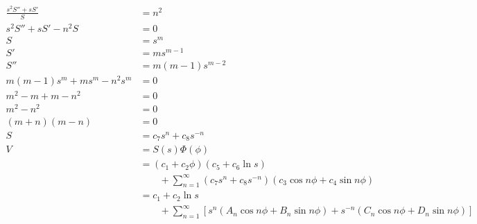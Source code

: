 \documentclass{article}
\begin{document}
\begin{align*}
  \frac{s^2 S'' + s S'}{S}        & = n^2                                                                                                               \\
  s^2 S'' + s S' - n^2 S          & = 0                                                                                                                 \\
  S                               & = s^m                                                                                                               \\
  S'                              & = m s^{m - 1}                                                                                                       \\
  S''                             & = m (m - 1) s^{m - 2}                                                                                               \\
  m (m - 1) s^m + m s^m - n^2 s^m & = 0                                                                                                                 \\
  m^2 - m + m - n^2               & = 0                                                                                                                 \\
  m^2 - n^2                       & = 0                                                                                                                 \\
  (m + n) (m - n)                 & = 0                                                                                                                 \\
  S                               & = c_7 s^n + c_8 s^{-n}                                                                                              \\
  V                               & = S(s) \Phi(\phi)                                                                                                   \\
                                  & = (c_1 + c_2 \phi) (c_5 + c_6 \ln s)                                                                                \\
                                  & \qquad + \sum_{n = 1}^\infty (c_7 s^n + c_8 s^{-n}) (c_3 \cos n \phi + c_4 \sin n \phi)                             \\
                                  & = c_1 + c_2 \ln s                                                                                                   \\
                                  & \qquad + \sum_{n = 1}^\infty [s^n (A_n \cos n \phi + B_n \sin n \phi) + s^{-n} (C_n \cos n \phi + D_n \sin n \phi)]
\end{align*}
\end{document}
